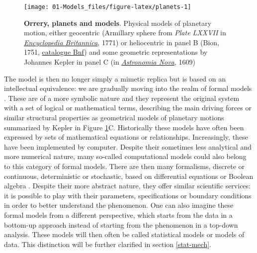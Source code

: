 \documentclass[a4paper,12pt,twoside,onecolumn,openright,final,oldfontcommands]{memoir}
\begin{document}
\begin{figure}

{\centering \texttt{[image: 01-Models\_files/figure-latex/planets-1]} 

}

\caption[Orrery, planets and models]{\textbf{Orrery, planets and models}. Physical
models of planetary motion, either geocentric (Armillary sphere from
\emph{Plate LXXVII} in
\href{https://commons.wikimedia.org/wiki/File:EB1711_Armillary_Sphere.png}{\emph{Encyclopedia
Britannica}}, 1771) or heliocentric in panel B (Bion, 1751,
\href{https://gallica.bnf.fr/ark:/12148/btv1b2600252q/f8.item.r=Bion}{catalogue
Bnf}) and some geometric representations by Johannes Kepler in panel C
(in
\href{https://commons.wikimedia.org/wiki/File:Kepler_astronomia_nova.jpg}{\emph{Astronomia
Nova}}, 1609)}\label{fig:planets}
\end{figure}












The model is then no longer simply a mimetic replica but is based on an
intellectual equivalence: we are gradually moving into the realm of
formal models \citep{rosenblueth1945role}. These are of a more symbolic
nature and they represent the original system with a set of logical or
mathematical terms, describing the main driving forces or similar
structural properties as geometrical models of planetary motions
summarized by Kepler in Figure \ref{fig:planets}C. Historically these
models have often been expressed by sets of mathematical equations or
relationships. Increasingly, these have been implemented by computer.
Despite their sometimes less analytical and more numerical nature, many
so-called computational models could also belong to this category of
formal models. There are then many formalisms, discrete or continuous,
deterministic or stochastic, based on differential equations or Boolean
algebra \citep{fowler1997mathematical}. Despite their more abstract
nature, they offer similar scientific services: it is possible to play
with their parameters, specifications or boundary conditions in order to
better understand the phenomenon. One can also imagine these formal
models from a different perspective, which starts from the data in a
bottom-up approach instead of starting from the phenomenon in a top-down
analysis. These models will then often be called statistical models or
models of data\citep{frigg2020models}. This distinction will be further
clarified in section \ref{stat-mech}.
\end{document}
